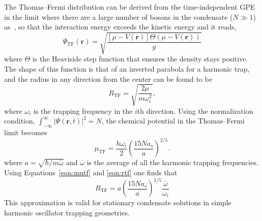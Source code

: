 The Thomas--Fermi distribution can be derived from the time-independent GPE in the limit where there are a large number of bosons in the condensate ($N \gg 1$) as~\cite{ueda2010}, so that the interaction energy exceeds the kinetic energy and it reads, 
\begin{equation}
\Psi_\text{TF}(\mathbf{r}) = \sqrt{\frac{[\mu-V(\mathbf{r})]\Theta(\mu-V(\mathbf{r}))}{g}}
\end{equation}
\noindent where $\Theta$ is the Heaviside step function that ensures the density stays positive.
The shape of this function is that of an inverted parabola for a harmonic trap, and the radius in any direction from the center can be found to be
\begin{equation}
R_\text{TF} = \sqrt{\frac{2\mu}{m\omega_i^2}},
\label{eqn:rtf}
\end{equation}
\noindent where $\omega_i$ is the trapping frequency in the $i$th direction.
Using the normalization condition, $\int_{-\infty}^\infty |\Psi(\mathbf{r},t)|^2 = N$, the chemical potential in the Thomas--Fermi limit becomes
\begin{equation}
\mu_\text{TF} = \frac{h\omega_i}{2}\left(\frac{15 N a_s}{a} \right)^{2/5}.
\label{eqn:mutf}
\end{equation}
\noindent where $a=\sqrt{\hbar/m\bar\omega}$ and $\bar \omega$ is the average of all the harmonic trapping frequencies.
Using Equations~\eqref{eqn:mutf} and \eqref{eqn:rtf} one finds that
\begin{equation}
R_\text{TF} = a\left(\frac{15 N a_s}{a} \right)^{1/5}\frac{\bar \omega}{\omega_i}
\end{equation}
This approximation is valid for stationary condensate solutions in simple harmonic oscillator trapping geometries.

